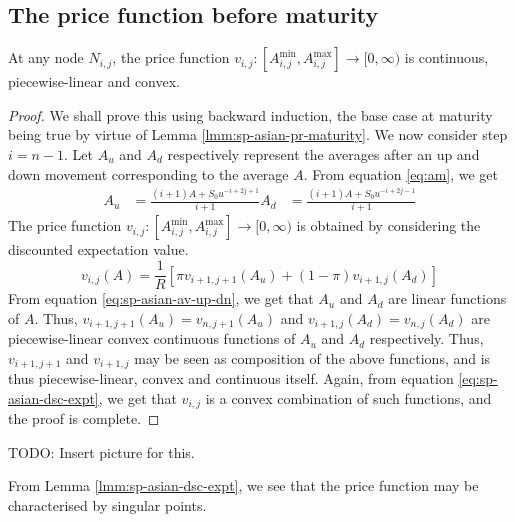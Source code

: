 \subsection{The price function before maturity}
\label{subsec:sp-asian-eu-price-gen}

\begin{lmm}
	\label{lmm:sp-asian-dsc-expt}
	At any node $ N_{i,j} $, the price function $ v_{i,j}: \left[ A_{i,j}^{\min}, A_{i,j}^{\max} \right] \to [0, \infty) $ is continuous, piecewise-linear and convex.
\end{lmm}

\begin{proof}
	We shall prove this using backward induction, the base case at maturity being true by virtue of Lemma \ref{lmm:sp-asian-pr-maturity}.
	We now consider step $ i = n-1 $. Let $A_u$ and $A_d$ respectively represent the averages after an up and down movement corresponding to the average $A$. From equation \ref{eq:am}, we get
	\begin{subequations}
		\label{eq:sp-asian-av-up-dn}
		\begin{align}
			A_u &= \frac{ (i+1) A + S_0 u^{-i+2j+1} }{ i+1 }
						A_d &= \frac{ (i+1) A + S_0 u^{-i+2j-1} }{ i+1 }
		\end{align}
	\end{subequations}
	The price function $ v_{i,j}: \left[ A_{i,j}^{\min}, A_{i,j}^{\max} \right] \to [0, \infty) $ is obtained by considering the discounted expectation value.
	\begin{equation}
		\label{eq:sp-asian-dsc-expt}
		v_{i,j}(A) = \frac{1}{R} \left[ \pi v_{i+1,j+1}(A_u) + (1 - \pi) v_{i+1,j}(A_d) \right]
	\end{equation}
	From equation \ref{eq:sp-asian-av-up-dn}, we get that $A_u$ and $A_d$ are linear functions of $A$. Thus, $ v_{i+1,j+1}(A_u) = v_{n,j+1}(A_u)$ and $ v_{i+1,j}(A_d) = v_{n,j}(A_d) $ are piecewise-linear convex continuous functions of $A_u$ and $A_d$ respectively. Thus, $ v_{i+1,j+1} $ and $ v_{i+1,j} $ may be seen as composition of the above functions, and is thus piecewise-linear, convex and continuous itself. Again, from equation \ref{eq:sp-asian-dsc-expt}, we get that $v_{i,j}$ is a convex combination of such functions, and the proof is complete.
\end{proof}
TODO: Insert picture for this.


\begin{rem}
	From Lemma \ref{lmm:sp-asian-dsc-expt}, we see that the price function may be characterised by singular points.
\end{rem}



